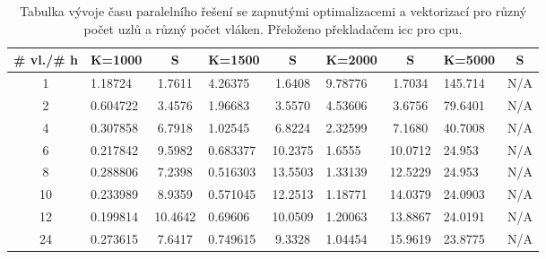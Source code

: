 \documentclass[a4paper,11pt]{article}
\begin{document}
  \begin{table}[ht]
  \begin{center}
   \begin{tabular}{|c|l|c|l|c|l|c|l|c|}
    \hline 
    \# vl./\# h & K=1000 & S & K=1500 & S & K=2000 & S & K=5000 & S\\
   \hline 
   \hline 
   1 & 1.18724 & 1.7611 & 4.26375 & 1.6408 & 9.78776 & 1.7034 & 145.714 & N/A\\
   \hline
    2 & 0.604722 & 3.4576 & 1.96683 & 3.5570 & 4.53606 & 3.6756 & 79.6401 & N/A\\
   \hline
    4 & 0.307858 & 6.7918 & 1.02545 & 6.8224 & 2.32599 & 7.1680 & 40.7008 & N/A\\
   \hline
    6 & 0.217842 & 9.5982 & 0.683377 & 10.2375 & 1.6555 & 10.0712 & 24.953 & N/A\\
   \hline
    8 & 0.288806 & 7.2398 & 0.516303 & 13.5503 & 1.33139 & 12.5229 & 24.953 & N/A\\
      \hline
    10 & 0.233989 & 8.9359 & 0.571045 & 12.2513 & 1.18771 & 14.0379 & 24.0903 & N/A\\ 
      \hline
    12 & 0.199814 & 10.4642 & 0.69606 & 10.0509 & 1.20063 & 13.8867 & 24.0191 & N/A\\
      \hline
    24 & 0.273615 & 7.6417 & 0.749615 & 9.3328 & 1.04454 & 15.9619 & 23.8775 & N/A\\
   \hline    
    \end{tabular}
   \caption{Tabulka vývoje času paralelního řešení se zapnutými optimalizacemi a vektorizací pro různý počet uzlů a různý počet vláken. Přeloženo 
   překladačem icc pro cpu.} 
   \label{tab.tab20}
  \end{center}   
  \end{table}
  
\end{document}
